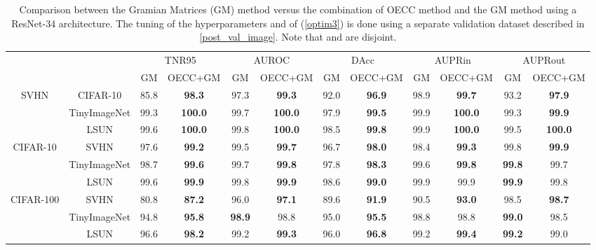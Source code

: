 \documentclass{article} \usepackage{iclr2020_conference,times}
\begin{document}
\begin{table*}[h]
\begin{adjustbox}{max width=\textwidth}
\begin{tabular}{cc|cc|cc|cc|cc|cc}
\multicolumn{2}{c}{}&\multicolumn{2}{c}{TNR95}&\multicolumn{2}{c}{AUROC}&\multicolumn{2}{c}{DAcc}&\multicolumn{2}{c}{AUPRin}&\multicolumn{2}{c}{AUPRout}\\
\cline{3-12} 
&&GM&OECC+GM&GM&OECC+GM&GM&OECC+GM&GM&OECC+GM&GM&OECC+GM\\
\hline
\multirow{3}{*}{{{SVHN}}}&CIFAR-10&85.8&\textbf{98.3}&97.3&\textbf{99.3}&92.0&\textbf{96.9}&98.9&\textbf{99.7}&93.2&\textbf{97.9}\\
&TinyImageNet&99.3&\textbf{100.0}&99.7&\textbf{100.0}&97.9&\textbf{99.5}&99.9&\textbf{100.0}&99.3&\textbf{99.9}\\
&LSUN&99.6&\textbf{100.0}&99.8&\textbf{100.0}&98.5&\textbf{99.8}&99.9&\textbf{100.0}&99.5&\textbf{100.0}\\
\hline
\multirow{3}{*}{{{CIFAR-10}}}&SVHN&97.6&\textbf{99.2}&99.5&\textbf{99.7}&96.7&\textbf{98.0}&98.4&\textbf{99.3}&99.8&\textbf{99.9}\\
&TinyImageNet&98.7&\textbf{99.6}&99.7&\textbf{99.8}&97.8&\textbf{98.3}&99.6&\textbf{99.8}&\textbf{99.8}&99.7\\
&LSUN&99.6&\textbf{99.9}&99.8&\textbf{99.9}&98.6&\textbf{99.0}&99.9&99.9&\textbf{99.9}&99.8\\
\hline
\multirow{3}{*}{{{CIFAR-100}}}&SVHN&80.8&\textbf{87.2}&96.0&\textbf{97.1}&89.6&\textbf{91.9}&90.5&\textbf{93.0}&98.5&\textbf{98.7}\\
&TinyImageNet&94.8&\textbf{95.8}&\textbf{98.9}&98.8&95.0&\textbf{95.5}&98.8&98.8&\textbf{99.0}&98.5\\
&LSUN&96.6&\textbf{98.2}&99.2&\textbf{99.3}&96.0&\textbf{96.8}&99.2&\textbf{99.4}&\textbf{99.2}&99.0\\
\hline
\end{tabular}
\end{adjustbox}
\caption{\label{FCorr}Comparison between the Gramian Matrices (GM) method \citep{ch2019detecting} versus the combination of OECC method and the GM method using a ResNet-34 architecture. The tuning of the hyperparameters  and  of (\ref{optim3}) is done using a separate validation dataset  described in \ref{post_val_image}. Note that  and  are disjoint.}
\end{table*}
\end{document}
